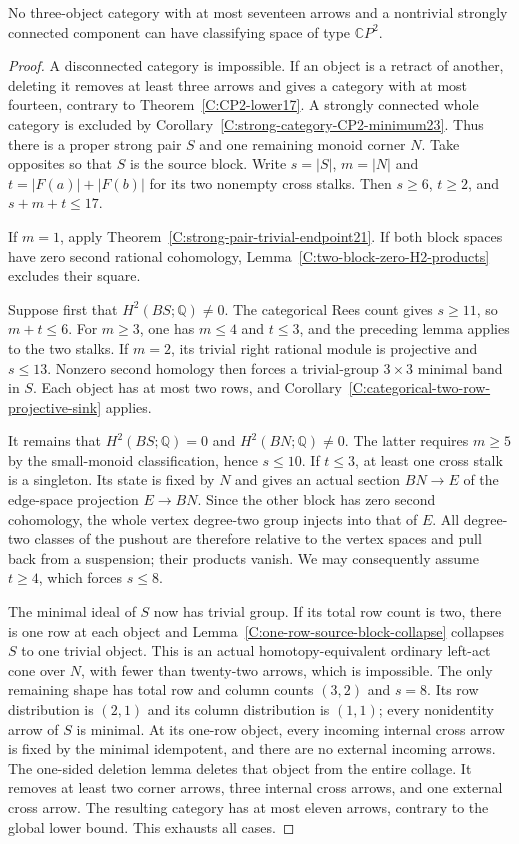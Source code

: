 \begin{theorem}\label{C:seventeen-three-strong-component}
No three-object category with at most seventeen arrows and a
nontrivial strongly connected component can have classifying
space of type $\mathbb CP^2$.
\end{theorem}
\begin{proof}
A disconnected category is impossible. If an object is a retract
of another, deleting it removes at least three arrows and gives
a category with at most fourteen, contrary to
Theorem~\ref{C:CP2-lower17}. A strongly connected whole category
is excluded by Corollary~\ref{C:strong-category-CP2-minimum23}.
Thus there is a proper strong pair $S$ and one remaining monoid
corner $N$. Take opposites so that $S$ is the source block.
Write $s=|S|$, $m=|N|$ and $t=|F(a)|+|F(b)|$ for its two
nonempty cross stalks. Then $s\geq6$, $t\geq2$, and
$s+m+t\leq17$.

If $m=1$, apply Theorem~\ref{C:strong-pair-trivial-endpoint21}.
If both block spaces have zero second rational cohomology,
Lemma~\ref{C:two-block-zero-H2-products} excludes their square.

Suppose first that $H^2(BS;\mathbb Q)\ne0$.
The categorical Rees count gives $s\geq11$, so $m+t\leq6$.
For $m\geq3$, one has $m\leq4$ and $t\leq3$, and the
preceding lemma applies to the two stalks. If $m=2$, its
trivial right rational module is projective and $s\leq13$.
Nonzero second homology then forces a trivial-group $3\times3$
minimal band in $S$. Each object has at most two rows, and
Corollary~\ref{C:categorical-two-row-projective-sink} applies.

It remains that $H^2(BS;\mathbb Q)=0$ and
$H^2(BN;\mathbb Q)\ne0$. The latter requires $m\geq5$ by
the small-monoid classification, hence $s\leq10$.
If $t\leq3$, at least one cross stalk is a singleton.
Its state is fixed by $N$ and gives an actual section
$BN\to E$ of the edge-space projection $E\to BN$.
Since the other block has zero second cohomology, the whole
vertex degree-two group injects into that of $E$.
All degree-two classes of the pushout are therefore relative
to the vertex spaces and pull back from a suspension; their
products vanish.
We may consequently assume $t\geq4$, which forces $s\leq8$.

The minimal ideal of $S$ now has trivial group. If its total
row count is two, there is one row at each object and
Lemma~\ref{C:one-row-source-block-collapse} collapses $S$
to one trivial object. This is an actual homotopy-equivalent
ordinary left-act cone over $N$, with fewer than twenty-two
arrows, which is impossible.
The only remaining shape has total row and column counts
$(3,2)$ and $s=8$. Its row distribution is $(2,1)$ and its
column distribution is $(1,1)$; every nonidentity arrow of
$S$ is minimal. At its one-row object, every incoming internal
cross arrow is fixed by the minimal idempotent, and there are
no external incoming arrows. The one-sided deletion lemma
deletes that object from the entire collage. It removes at
least two corner arrows, three internal cross arrows, and
one external cross arrow. The resulting category has at most
eleven arrows, contrary to the global lower bound.
This exhausts all cases.
\end{proof}
